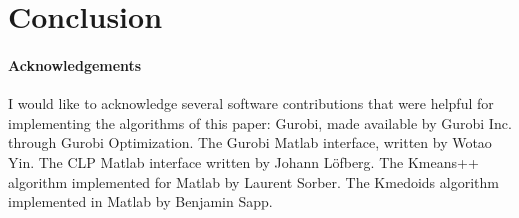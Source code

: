 \section{Conclusion}
\paragraph{Acknowledgements}
I would like to acknowledge several software contributions that were helpful for implementing the algorithms of this paper: Gurobi, made available by Gurobi Inc. through Gurobi Optimization. The Gurobi Matlab interface, written by Wotao Yin. The CLP Matlab interface written by Johann L\"{o}fberg. The Kmeans++ algorithm implemented for Matlab by Laurent Sorber. The Kmedoids algorithm implemented in Matlab by Benjamin Sapp.

